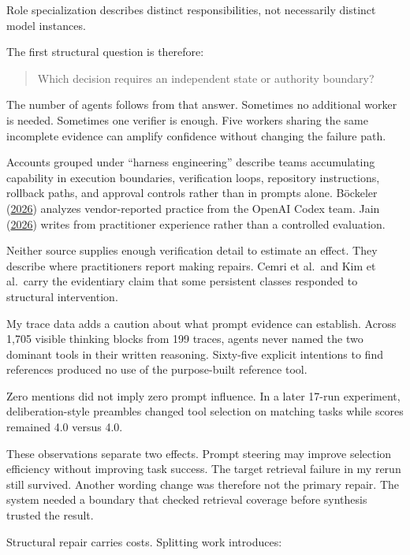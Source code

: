 Role specialization describes distinct responsibilities, not necessarily distinct model instances.

The first structural question is therefore:

\begin{quote}
Which decision requires an independent state or authority boundary?
\end{quote}

The number of agents follows from that answer. Sometimes no additional worker is needed. Sometimes one verifier is enough. Five workers sharing the same incomplete evidence can amplify confidence without changing the failure path.

Accounts grouped under ``harness engineering'' describe teams accumulating capability in execution boundaries, verification loops, repository instructions, rollback paths, and approval controls rather than in prompts alone. Böckeler (\href{https://martinfowler.com/articles/exploring-gen-ai/harness-engineering.html}{2026}) analyzes vendor-reported practice from the OpenAI Codex team. Jain (\href{https://www.reddit.com/r/devops/comments/1touxz4/}{2026}) writes from practitioner experience rather than a controlled evaluation.

Neither source supplies enough verification detail to estimate an effect. They describe where practitioners report making repairs. Cemri et al.~and Kim et al.~carry the evidentiary claim that some persistent classes responded to structural intervention.

My trace data adds a caution about what prompt evidence can establish. Across 1,705 visible thinking blocks from 199 traces, agents never named the two dominant tools in their written reasoning. Sixty-five explicit intentions to find references produced no use of the purpose-built reference tool.

Zero mentions did not imply zero prompt influence. In a later 17-run experiment, deliberation-style preambles changed tool selection on matching tasks while scores remained 4.0 versus 4.0.

These observations separate two effects. Prompt steering may improve selection efficiency without improving task success. The target retrieval failure in my rerun still survived. Another wording change was therefore not the primary repair. The system needed a boundary that checked retrieval coverage before synthesis trusted the result.

Structural repair carries costs. Splitting work introduces:

